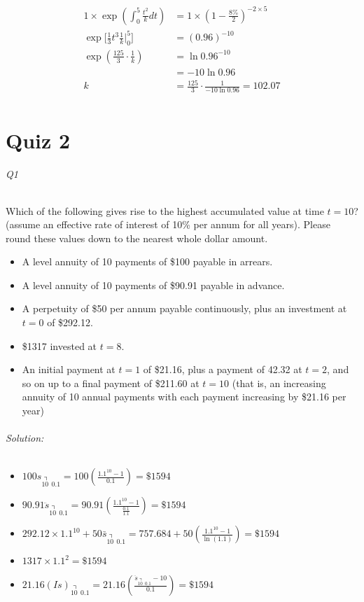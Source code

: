 \documentclass[a4paper, 11pt, twoside]{article}
\begin{document}
\[
\begin{split}
	1\times \exp\left(\int^5_0\frac{t^2}{k} dt\right) &= 1 \times (1 -\frac{8\%}{2})^{-2\times 5}\\
	\exp\bigg[\frac13 t^3 \frac1{k}\bigg\vert^5_0\bigg] &= (0.96)^{-10}\\
	\exp\left(\frac{125}3\cdot \frac1k\right) &= \ln{0.96}^{-10}\\
	&= -10\ln{0.96}\\
	k&=\frac{125}3\cdot\frac1{-10\ln{0.96}}=102.07\\
\end{split}
\]

\part{Quiz 2}

\paragraph{Q1} Which of the following gives rise to the highest accumulated value at time $t=10$? (assume an effective rate of interest of 10\% per annum for all years). Please round these values down to the nearest whole dollar amount.

\begin{itemize}
	\item A level annuity of 10 payments of \$100 payable in arrears.
	\item A level annuity of 10 payments of \$90.91 payable in advance.
	\item A perpetuity of \$50 per annum payable continuously, plus an investment at $t=0$ of \$292.12.
	\item \$1317 invested at $t=8$.
	\item An initial payment at $t=1$ of \$21.16, plus a payment of 42.32 at $t=2$, and so on up to a final payment of \$211.60 at $t=10$ (that is, an increasing annuity of 10 annual payments with each payment increasing by \$21.16 per year)\\
\end{itemize}

\paragraph{Solution:}

\begin{itemize}
	\item $100s_{\annuity{10\ \ }0.1}=100\left(\frac{1.1^{10}-1}{0.1}\right)=\$1594$
	\item $90.91\ddot{s}_{\annuity{10\ \ }0.1}=90.91\left(\frac{1.1^{10}-1}{\frac{0.1}{1.1}}\right)=\$1594$
	\item $292.12\times 1.1^{10}+50\bar{s}_{\annuity{10\ \ }0.1} =757.684+50\left(\frac{1.1^{10}-1}{\ln{(1.1)}}\right)=\$1594$
	\item $1317\times 1.1^2 = \$1594$
	\item $21.16(Is)_{\annuity{10\ \ }0.1}=21.16\left(\frac{\ddot{s}_{\annuity{10\ \ }0.1}-10}{0.1}\right)=\$1594$
\end{itemize}
\end{document}
